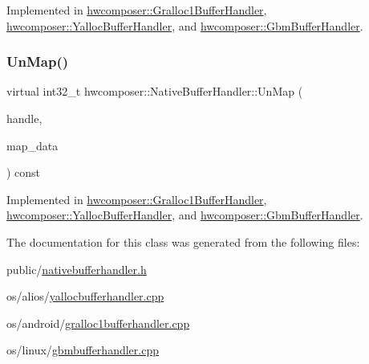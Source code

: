 Implemented in \mbox{\hyperlink{classhwcomposer_1_1Gralloc1BufferHandler_a21b27b52da92605736b164e8088b93fe}{hwcomposer\+::\+Gralloc1\+Buffer\+Handler}}, \mbox{\hyperlink{classhwcomposer_1_1YallocBufferHandler_a1d9ec2a830f6a8df3f454d1e2ac8893c}{hwcomposer\+::\+Yalloc\+Buffer\+Handler}}, and \mbox{\hyperlink{classhwcomposer_1_1GbmBufferHandler_a9c2554d5c2fe0a76b785352754d369a1}{hwcomposer\+::\+Gbm\+Buffer\+Handler}}.

\mbox{\label{classhwcomposer_1_1NativeBufferHandler_ae0da63bfef3f8342460fa1a958f8359c}} 
\subsubsection{\texorpdfstring{Un\+Map()}{UnMap()}}
{\footnotesize\ttfamily virtual int32\+\_\+t hwcomposer\+::\+Native\+Buffer\+Handler\+::\+Un\+Map (\begin{DoxyParamCaption}\item[{\mbox{\hyperlink{alios_2platformdefines_8h_ac0a2eaf260f556d17fe489911f017bdf}{H\+W\+C\+Native\+Handle}}}]{handle,  }\item[{void $\ast$}]{map\+\_\+data }\end{DoxyParamCaption}) const\hspace{0.3cm}{\ttfamily [pure virtual]}}



Implemented in \mbox{\hyperlink{classhwcomposer_1_1Gralloc1BufferHandler_a147ec425ec0fda400f1d4dd5c60764d9}{hwcomposer\+::\+Gralloc1\+Buffer\+Handler}}, \mbox{\hyperlink{classhwcomposer_1_1YallocBufferHandler_aea0fe826446e533862bea12e882c59ba}{hwcomposer\+::\+Yalloc\+Buffer\+Handler}}, and \mbox{\hyperlink{classhwcomposer_1_1GbmBufferHandler_af26a61bbdd91d36780e41b406e8b8dd9}{hwcomposer\+::\+Gbm\+Buffer\+Handler}}.



The documentation for this class was generated from the following files\+:\begin{DoxyCompactItemize}
\item 
public/\mbox{\hyperlink{nativebufferhandler_8h}{nativebufferhandler.\+h}}\item 
os/alios/\mbox{\hyperlink{yallocbufferhandler_8cpp}{yallocbufferhandler.\+cpp}}\item 
os/android/\mbox{\hyperlink{gralloc1bufferhandler_8cpp}{gralloc1bufferhandler.\+cpp}}\item 
os/linux/\mbox{\hyperlink{gbmbufferhandler_8cpp}{gbmbufferhandler.\+cpp}}\end{DoxyCompactItemize}

